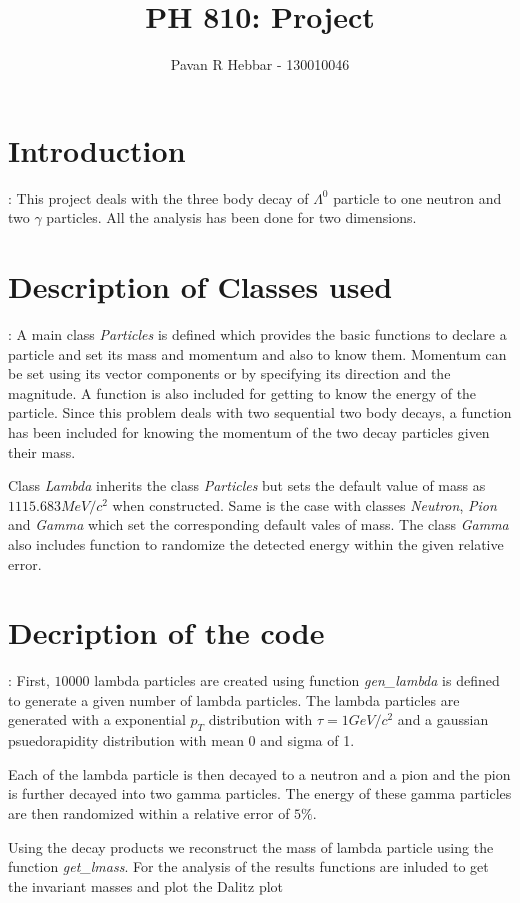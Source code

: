 \documentclass[11pt, a4paper]{article}
\title{\textbf{PH 810: Project}}
\author{Pavan R Hebbar - 130010046}
\begin{document}
\maketitle
\newpage
\tableofcontents
\newpage
\section{Introduction}:
This project deals with the three body decay of $\Lambda^0$ particle to one neutron and two $\gamma$ particles. All the 
analysis has been done for two dimensions.

\section{Description of Classes used}:
A main class \emph{Particles} is defined which provides the basic functions to declare a particle and set its mass and 
momentum and also to know them. Momentum can be set using its vector components or by specifying its direction and the 
magnitude. A function is also included for getting to know the energy of the particle. Since this problem deals with two
sequential two body decays, a function has been included for knowing the momentum of the two decay particles given their mass.

Class \emph{Lambda} inherits the class \emph{Particles} but sets the default value of mass as $1115.683 MeV/c^2$ when constructed. Same is the 
case with classes \emph{Neutron}, \emph{Pion} and \emph{Gamma} which set the corresponding default vales of mass. The class 
\emph{Gamma} also includes function to randomize the detected energy within the given relative error.

\section{Decription of the code}:
First, $10000$ lambda particles are created using function \emph{gen\_lambda} is defined to generate a given number of lambda particles. The lambda particles are
generated with a exponential $p_T$ distribution with $\tau = 1 GeV/c^2$ and a gaussian psuedorapidity distribution with mean 0
and sigma of 1. 

Each of the lambda particle is then decayed to a neutron and a pion and the pion is further decayed into two gamma particles.
The energy of these gamma particles are then randomized within a relative error of $5\%$.

Using the decay products we reconstruct the mass of lambda particle using the function \emph{get\_lmass}. For the analysis of the
results functions are inluded to get the invariant masses and plot the Dalitz plot
\end{document}
